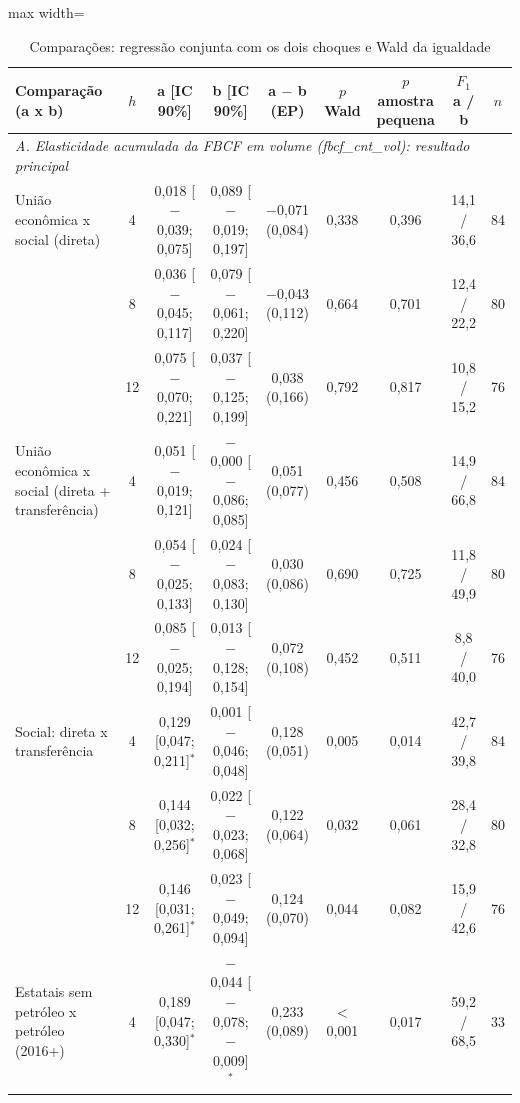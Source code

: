 \begin{table}[htbp]
\centering
\caption{Compara\c{c}\~oes: regress\~ao conjunta com os dois choques e Wald da igualdade}
\label{tab:a6_lp_cmp}
\scriptsize
\begin{adjustbox}{max width=\linewidth}
\begin{tabular}{p{3.4cm}cccccccc}
\toprule
Compara\c{c}\~ao (a x b) & $h$ & a [IC 90\%] & b [IC 90\%] & a $-$ b (EP) & $p$ Wald & $p$ amostra pequena & $F_1$ a / b & $n$ \\
\midrule
\multicolumn{9}{l}{\textit{A. Elasticidade acumulada da FBCF em volume (fbcf\_cnt\_vol): resultado principal}} \\
Uni\~ao econ\^omica x social (direta) & 4 & 0{,}018 [$-$0{,}039; 0{,}075] & 0{,}089 [$-$0{,}019; 0{,}197] & $-$0{,}071 (0{,}084) & 0{,}338 & 0{,}396 & 14{,}1 / 36{,}6 & 84 \\
 & 8 & 0{,}036 [$-$0{,}045; 0{,}117] & 0{,}079 [$-$0{,}061; 0{,}220] & $-$0{,}043 (0{,}112) & 0{,}664 & 0{,}701 & 12{,}4 / 22{,}2 & 80 \\
 & 12 & 0{,}075 [$-$0{,}070; 0{,}221] & 0{,}037 [$-$0{,}125; 0{,}199] & 0{,}038 (0{,}166) & 0{,}792 & 0{,}817 & 10{,}8 / 15{,}2 & 76 \\
Uni\~ao econ\^omica x social (direta + transfer\^encia) & 4 & 0{,}051 [$-$0{,}019; 0{,}121] & $-$0{,}000 [$-$0{,}086; 0{,}085] & 0{,}051 (0{,}077) & 0{,}456 & 0{,}508 & 14{,}9 / 66{,}8 & 84 \\
 & 8 & 0{,}054 [$-$0{,}025; 0{,}133] & 0{,}024 [$-$0{,}083; 0{,}130] & 0{,}030 (0{,}086) & 0{,}690 & 0{,}725 & 11{,}8 / 49{,}9 & 80 \\
 & 12 & 0{,}085 [$-$0{,}025; 0{,}194] & 0{,}013 [$-$0{,}128; 0{,}154] & 0{,}072 (0{,}108) & 0{,}452 & 0{,}511 & 8{,}8 / 40{,}0 & 76 \\
Social: direta x transfer\^encia & 4 & 0{,}129 [0{,}047; 0{,}211]$^{*}$ & 0{,}001 [$-$0{,}046; 0{,}048] & 0{,}128 (0{,}051) & 0{,}005 & 0{,}014 & 42{,}7 / 39{,}8 & 84 \\
 & 8 & 0{,}144 [0{,}032; 0{,}256]$^{*}$ & 0{,}022 [$-$0{,}023; 0{,}068] & 0{,}122 (0{,}064) & 0{,}032 & 0{,}061 & 28{,}4 / 32{,}8 & 80 \\
 & 12 & 0{,}146 [0{,}031; 0{,}261]$^{*}$ & 0{,}023 [$-$0{,}049; 0{,}094] & 0{,}124 (0{,}070) & 0{,}044 & 0{,}082 & 15{,}9 / 42{,}6 & 76 \\
Estatais sem petr\'oleo x petr\'oleo (2016+) & 4 & 0{,}189 [0{,}047; 0{,}330]$^{*}$ & $-$0{,}044 [$-$0{,}078; $-$0{,}009]$^{*}$ & 0{,}233 (0{,}089) & $<$0{,}001 & 0{,}017 & 59{,}2 / 68{,}5 & 33 \\

\end{tabular}
\end{adjustbox}
\end{table}
